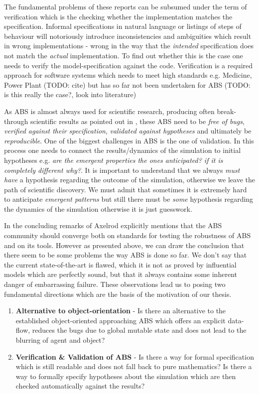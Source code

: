 The fundamental problems of these reports can be subsumed under the term of verification which is the checking whether the implementation matches the specification. Informal specifications in natural language or listings of steps of behaviour will notoriously introduce inconsistencies and ambiguities which result in wrong implementations - wrong in the way that the \textit{intended} specification does not match the \textit{actual} implementation. To find out whether this is the case one needs to verify the model-specification against the code. Verification is a required approach for software systems which needs to meet high standards e.g. Medicine, Power Plant (TODO: cite) but has so far not been undertaken for ABS (TODO: is this really the case?, look into literature)

As ABS is almost always used for scientific research, producing often break-through scientific results as pointed out in \cite{axelrod_chapter_2006}, these ABS need to be \textit{free of bugs}, \textit{verified against their specification}, \textit{validated against hypotheses} and ultimately be \textit{reproducible}. One of the biggest challenges in ABS is the one of validation. In this process one needs to connect the results/dynamics of the simulation to initial hypotheses e.g. \textit{are the emergent properties the ones anticipated? if it is completely different why?}. It is important to understand that we always \textit{must have} a hypothesis regarding the outcome of the simulation, otherwise we leave the path of scientific discovery. We must admit that sometimes it is extremely hard to anticipate \textit{emergent patterns} but still there must be \textit{some} hypothesis regarding the dynamics of the simulation otherwise it is just guesswork.

In the concluding remarks of \cite{axelrod_chapter_2006} Axelrod explicitly mentions that the ABS community should converge both on standards for testing the robustness of ABS and on its tools. However as presented above, we can draw the conclusion that there seem to be some problems the way ABS is done so far. We don't say that the current state-of-the-art is flawed, which it is not as proved by influential models which are perfectly sound, but that it always contains some inherent danger of embarrassing failure. These observations lead us to posing two fundamental directions which are the basis of the motivation of our thesis.

\begin{enumerate}
	\item \textbf{Alternative to object-orientation} - Is there an alternative to the established object-oriented approaching ABS which offers an explicit data-flow, reduces the bugs due to global mutable state and does not lead to the blurring of agent and object?
	\item \textbf{Verification \& Validation of ABS} - Is there a way for formal specification which is still readable and does not fall back to pure mathematics? Is there a way to formally specify hypotheses about the simulation which are then checked automatically against the results?
\end{enumerate}

